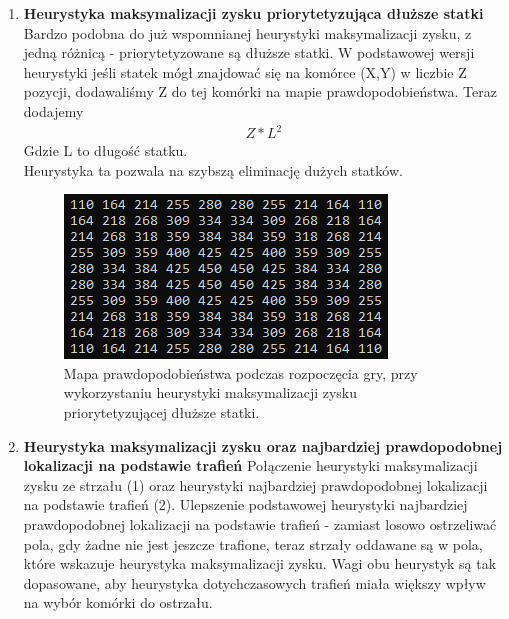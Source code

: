 \begin{enumerate}
  \item \textbf{Heurystyka maksymalizacji zysku priorytetyzująca dłuższe statki} Bardzo podobna do już wspomnianej heurystyki maksymalizacji zysku, z jedną różnicą - priorytetyzowane są dłuższe statki. W podstawowej wersji heurystyki jeśli statek mógł znajdować się na komórce (X,Y) w liczbie Z pozycji, dodawaliśmy Z do tej komórki na mapie prawdopodobieństwa. Teraz dodajemy
  \begin{align*}
    Z * L^2
\end{align*}
Gdzie L to długość statku.
  \\ Heurystyka ta pozwala na szybszą eliminację dużych statków.
    \begin{figure}[!h]
    \label{fig:mapa-prawdopodobienstwa-max-zysku-wazona}
    \centering \includegraphics[width=0.5\linewidth]{img/max-benefit-weighted.PNG}
    \caption{Mapa prawdopodobieństwa podczas rozpoczęcia gry, przy wykorzystaniu heurystyki maksymalizacji zysku priorytetyzującej dłuższe statki.}
    \end{figure}

  \item \textbf{Heurystyka maksymalizacji zysku oraz najbardziej prawdopodobnej lokalizacji na podstawie trafień} Połączenie heurystyki maksymalizacji zysku ze strzału (1) oraz heurystyki najbardziej prawdopodobnej lokalizacji na podstawie trafień (2). Ulepszenie podstawowej heurystyki najbardziej prawdopodobnej lokalizacji na podstawie trafień - zamiast losowo ostrzeliwać pola, gdy żadne nie jest jeszcze trafione, teraz strzały oddawane są w pola, które wskazuje heurystyka maksymalizacji zysku. Wagi obu heurystyk są tak dopasowane, aby heurystyka dotychczasowych trafień miała większy wpływ na wybór komórki do ostrzału.


\end{enumerate}
